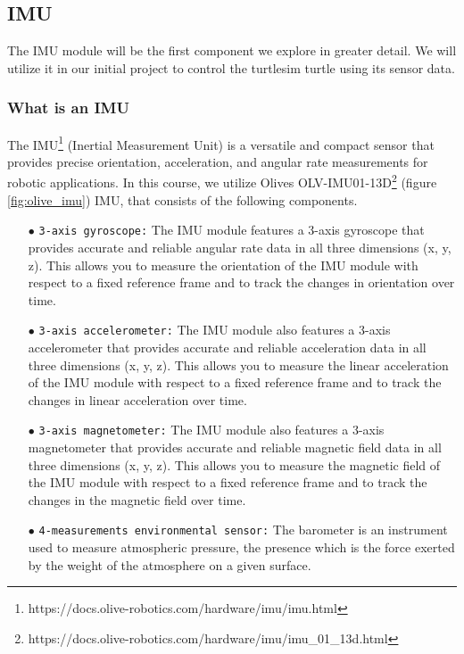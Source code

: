 \documentclass{article}
\begin{document}
\subsection{IMU}
The IMU module will be the first component we explore in greater detail. We will utilize it in our initial project to control the turtlesim turtle using its sensor data.

\subsubsection{What is an IMU}
The IMU\footnote{https://docs.olive-robotics.com/hardware/imu/imu.html} (Inertial Measurement Unit) is a versatile and compact sensor that provides precise orientation, acceleration, and angular rate measurements for robotic applications. In this course, we utilize Olives OLV-IMU01-13D\footnote{https://docs.olive-robotics.com/hardware/imu/imu\_01\_13d.html} (figure \ref{fig:olive_imu}) IMU, that consists of the following components.
\begin{enumerate}
    \item[$\bullet$]\texttt{3-axis gyroscope:} The IMU module features a 3-axis gyroscope that provides accurate and reliable angular rate data in all three dimensions (x, y, z). This allows you to measure the orientation of the IMU module with respect to a fixed reference frame and to track the changes in orientation over time.
    \item[$\bullet$]\texttt{3-axis accelerometer:} The IMU module also features a 3-axis accelerometer that provides accurate and reliable acceleration data in all three dimensions (x, y, z). This allows you to measure the linear acceleration of the IMU module with respect to a fixed reference frame and to track the changes in linear acceleration over time.
    \item[$\bullet$]\texttt{3-axis magnetometer:} The IMU module also features a 3-axis magnetometer that provides accurate and reliable magnetic field data in all three dimensions (x, y, z). This allows you to measure the magnetic field of the IMU module with respect to a fixed reference frame and to track the changes in the magnetic field over time.
    \item[$\bullet$]\texttt{4-measurements environmental sensor:} The barometer is an instrument used to measure atmospheric pressure, the presence which is the force exerted by the weight of the atmosphere on a given surface.
\end{enumerate}
\end{document}
